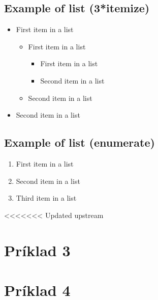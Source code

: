 \documentclass[paper=a4, fontsize=11pt]{scrartcl} %
\numberwithin{equation}{section} %
\numberwithin{figure}{section} %
\numberwithin{table}{section} %
\begin{document}
\subsection{Example of list (3*itemize)}
\begin{itemize}
	\item First item in a list 
		\begin{itemize}
		\item First item in a list 
			\begin{itemize}
			\item First item in a list 
			\item Second item in a list 
			\end{itemize}
		\item Second item in a list 
		\end{itemize}
	\item Second item in a list 
\end{itemize}


\subsection{Example of list (enumerate)}
\begin{enumerate}
\item First item in a list 
\item Second item in a list 
\item Third item in a list
\end{enumerate}


<<<<<<< Updated upstream
\pagebreak

\section*{Príklad 3}

\pagebreak

\section*{Príklad 4}
\end{document}
